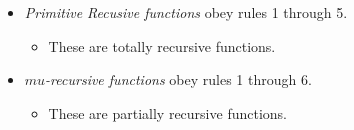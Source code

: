 \begin{itemize}[noitemsep]
\item \emph{Primitive Recusive functions} obey rules 1 through 5.
  \begin{itemize}[noitemsep]
  \item These are totally recursive functions.
  \end{itemize}
\item \emph{$mu$-recursive functions} obey rules 1 through 6.
  \begin{itemize}[noitemsep]
  \item These are partially recursive functions.
  \end{itemize}
\end{itemize}


